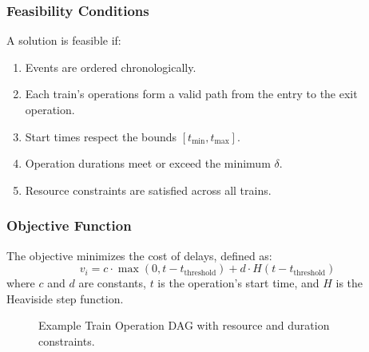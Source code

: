 \documentclass[runningheads]{llncs}
\begin{document}
\subsubsection{Feasibility Conditions}
A solution is feasible if:
\begin{enumerate}
    \item Events are ordered chronologically.
    \item Each train's operations form a valid path from the entry to the exit operation.
    \item Start times respect the bounds $[t_{\text{min}}, t_{\text{max}}]$.
    \item Operation durations meet or exceed the minimum $\delta$.
    \item Resource constraints are satisfied across all trains.
\end{enumerate}

\subsubsection{Objective Function}
The objective minimizes the cost of delays, defined as:
\[
v_i = c \cdot \max(0, t - t_{\text{threshold}}) + d \cdot H(t - t_{\text{threshold}})
\]
where $c$ and $d$ are constants, $t$ is the operation's start time, and $H$ is the Heaviside step function.

\begin{figure}
    \centering
    \caption{Example Train Operation DAG with resource and duration constraints.}
    \label{fig:train_dag}
\end{figure}
\end{document}
